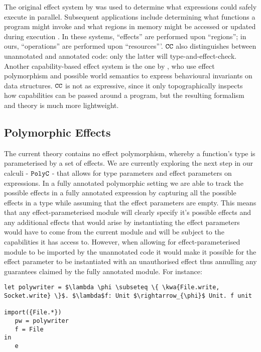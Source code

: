 The original effect system by \citet{lucassen88} was used to determine what expressions could safely execute in parallel. Subsequent applications include determining what functions a program might invoke \cite{tang94} and what regions in memory might be accessed or updated during execution \cite{talpin94}. In these systems, ``effects'' are performed upon ``regions''; in ours, ``operations'' are performed upon ``resources'''. $\mathtt{CC}$ also distinguishes between unannotated and annotated code: only the latter will type-and-effect-check. Another capability-based effect system is the one by \citet{devriese16}, who use effect polymorphism and possible world semantics to express behavioural invariants on data structures. $\mathtt{CC}$ is not as expressive, since it only topographically inspects how capabilities can be passed around a program, but the resulting formalism and theory is much more lightweight.

\subsection{Polymorphic Effects}

The current theory contains no effect polymorphism, whereby a function's type is parameterised by a set of effects. We are currently exploring the next step in our calculi - $\mathtt{PolyC}$ - that allows for type parameters and effect parameters on expressions. In a fully annotated polymorphic setting we are able to track the possible effects in a fully annotated expression by capturing all the possible effects in a type while assuming that the effect parameters are empty. This means that any effect-parameterised module will clearly specify it's possible effects and any additional effects that would arise by instantiating the effect parameters would have to come from the current module and will be subject to the capabilities it has access to. However, when allowing for effect-parameterised module to be imported by the unannotated code it would make it possible for the effect parameter to be instantiated with an unauthorised effect thus annulling any guarantees claimed by the fully annotated module. For instance:

\begin{lstlisting}
let polywriter = $\lambda \phi \subseteq \{ \kwa{File.write, Socket.write} \}$. $\lambda$f: Unit $\rightarrow_{\phi}$ Unit. f unit

import({File.*}) 
   pw = polywriter
   f = File
in
   e
\end{lstlisting}

